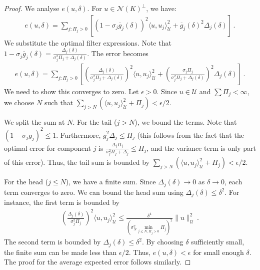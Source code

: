 \begin{proof}
We analyse $e(u, \delta)$. For $u \in \mathcal{N}(K)^\perp$, we have:
\begin{align*}
e(u, \delta) = \sum_{j: \Pi_j>0} \left[ (1 - \sigma_j \overline{g}_j(\delta))^2 \langle u, u_j \rangle_{\mathcal{U}}^2 + \overline{g}_j(\delta)^2 \Delta_j(\delta) \right] \, .
\end{align*}
We substitute the optimal filter expressions. Note that $1 - \sigma_j \overline{g}_j(\delta) = \frac{\Delta_j(\delta)}{\sigma_j^2 \Pi_j + \Delta_j(\delta)}$. The error becomes
\begin{align*}
e(u, \delta) = \sum_{j: \Pi_j>0} \left[ \left(\frac{\Delta_j(\delta)}{\sigma_j^2 \Pi_j + \Delta_j(\delta)}\right)^2 \langle u, u_j \rangle_{\mathcal{U}}^2 + \left(\frac{\sigma_j \Pi_j}{\sigma_j^2 \Pi_j + \Delta_j(\delta)}\right)^2 \Delta_j(\delta) \right] \, .
\end{align*}
We need to show this converges to zero. Let $\epsilon > 0$. Since $u \in \mathcal{U}$ and $\sum \Pi_j < \infty$, we choose $N$ such that $\sum_{j>N} (\langle u, u_j \rangle_{\mathcal{U}}^2 + \Pi_j) < \epsilon/2$.

We split the sum at $N$. For the tail ($j>N$), we bound the terms. Note that $(1 - \sigma_j \overline{g}_j)^2 \leq 1$. Furthermore, $\overline{g}_j^2 \Delta_j \leq \Pi_j$ (this follows from the fact that the optimal error for component $j$ is $\frac{\Delta_j \Pi_j}{\sigma_j^2 \Pi_j + \Delta_j} \leq \Pi_j$, and the variance term is only part of this error). Thus, the tail sum is bounded by $\sum_{j>N} (\langle u, u_j \rangle_{\mathcal{U}}^2 + \Pi_j) < \epsilon/2$.

For the head ($j \leq N$), we have a finite sum. Since $\Delta_j(\delta) \to 0$ as $\delta \to 0$, each term converges to zero. We can bound the head sum using $\Delta_j(\delta) \leq \delta^2$. For instance, the first term is bounded by
\begin{align*}
\left(\frac{\Delta_j(\delta)}{\sigma_j^2 \Pi_j}\right)^2 \langle u, u_j \rangle_{\mathcal{U}}^2 \leq \frac{\delta^4}{(\sigma_N^2 \min_{j\leq N, \Pi_j>0} \Pi_j)^2} \|u\|_{\mathcal{U}}^2 \, .
\end{align*}
The second term is bounded by $\Delta_j(\delta) \leq \delta^2$. By choosing $\delta$ sufficiently small, the finite sum can be made less than $\epsilon/2$. Thus, $e(u, \delta) < \epsilon$ for small enough $\delta$. The proof for the average expected error follows similarly.
\end{proof}

